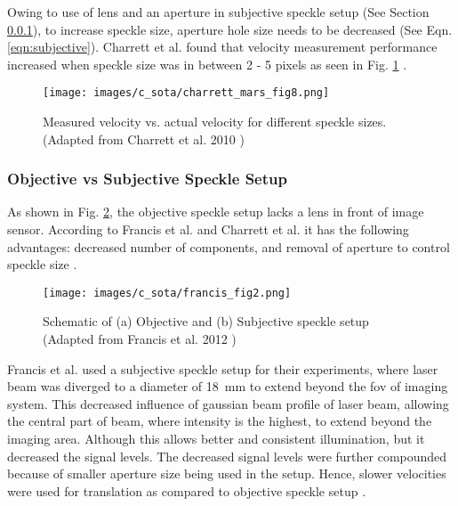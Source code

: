     \vspace{5mm}

    \noindent Owing to use of lens and an aperture in subjective speckle setup (See Section \ref{Subsubsection:Objective_Subjective}), to increase speckle size, aperture hole size needs to be decreased (See Eqn. \ref{eqn:subjective}). Charrett et al. found that velocity measurement performance increased when speckle size was in between 2 - 5 pixels as seen in Fig. \ref{fig:charrett_mars_fig8} \cite{charrett_mars}.

    \begin{figure}[h]
        \centering
        \texttt{[image: images/c\_sota/charrett\_mars\_fig8.png]}
        \caption{Measured velocity vs. actual velocity for different speckle sizes. (Adapted from Charrett et al. 2010 \cite{charrett_mars})}
        \label{fig:charrett_mars_fig8}
    \end{figure}

    \subsubsection{Objective vs Subjective Speckle Setup}\label{Subsubsection:Objective_Subjective}

    As shown in Fig. \ref{fig:francis_fig2}, the objective speckle setup lacks a lens in front of image sensor. According to Francis et al. and Charrett et al. it has the following advantages: decreased number of components, and removal of aperture to control speckle size \cite{charrett_2018, francis_autonomous}.

    \begin{figure}[h]
        \centering
        \texttt{[image: images/c\_sota/francis\_fig2.png]}
        \caption{Schematic of (a) Objective and (b) Subjective speckle setup (Adapted from Francis et al. 2012 \cite{francis_autonomous})}
        \label{fig:francis_fig2}
    \end{figure}

    \noindent Francis et al. used a subjective speckle setup for their experiments, where laser beam was diverged to a diameter of \SI{18}{\milli\meter} to extend beyond the \gls{fov} of imaging system. This decreased influence of gaussian beam profile of laser beam, allowing the central part of beam, where intensity is the highest, to extend beyond the imaging area. Although this allows better and consistent illumination, but it decreased the signal levels. The decreased signal levels were further compounded because of smaller aperture size being used in the setup. Hence, slower velocities were used for translation as compared to objective speckle setup \cite{francis_autonomous}.

